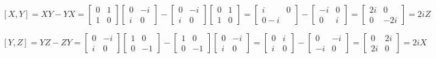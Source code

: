 \exercise
$$[X, Y] = XY - YX = \begin{bmatrix}
0 & 1 \\
1 & 0
\end{bmatrix} \begin{bmatrix}
0 & -i \\
i & 0
\end{bmatrix} - \begin{bmatrix}
0 & -i \\
i & 0
\end{bmatrix} \begin{bmatrix}
0 & 1 \\
1 & 0
\end{bmatrix} = \begin{bmatrix}
i & 0 \\
0 -i
\end{bmatrix} - \begin{bmatrix}
-i & 0 \\
0 & i
\end{bmatrix} = \begin{bmatrix}
2i & 0 \\
0 & -2i
\end{bmatrix} = 2iZ$$

$$[Y, Z] = YZ - ZY = \begin{bmatrix}
0 & -i \\
i & 0
\end{bmatrix} \begin{bmatrix}
1 & 0 \\
0 & -1
\end{bmatrix} - \begin{bmatrix}
1 & 0 \\
0 & -1
\end{bmatrix} \begin{bmatrix}
0 & -i \\
i & 0
\end{bmatrix} = \begin{bmatrix}
0 & i \\
i & 0
\end{bmatrix} - \begin{bmatrix}
0 & -i \\
-i & 0
\end{bmatrix} = \begin{bmatrix}
0 & 2i \\
2i & 0
\end{bmatrix} = 2iX$$

